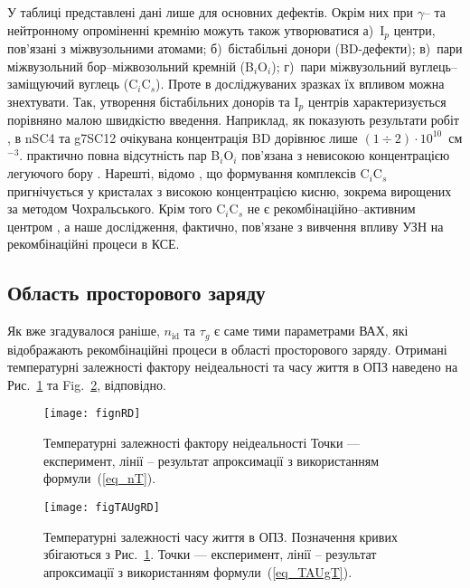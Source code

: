 У таблиці представлені дані лише для основних дефектів.
Окрім них при $\gamma$-- та нейтронному опроміненні кремнію можуть також утворюватися
а)~I$_p$ центри, пов'язані з міжвузольними атомами;
б)~бістабільні донори (BD-дефекти);
в)~пари міжвузольний бор--міжвозольний кремній (B$_i$O$_i$);
г)~пари міжвузольний вуглець--заміщуючий вуглець (C$_i$C$_s$).
Проте в досліджуваних зразках їх впливом можна знехтувати.
Так, утворення бістабільних донорів та I$_p$ центрів характеризується порівняно малою швидкістю введення.
Наприклад, як показують результати робіт \cite{n:gamma,BD:Fret}, в nSC4 та g7SC12 очікувана
концентрація BD дорівнює лише $(1\div2)\cdot10^{10}$~см$^{-3}$.
практично повна відсутність пар B$_i$O$_i$ пов'язана з невисокою концентрацією легуючого бору \cite{SiIntDef}.
Нарешті, відомо \cite{gamma:Kolkr,gamma:Stahl,n:long}, що формування комплексів C$_i$C$_s$ пригнічується у кристалах
з високою концентрацією кисню, зокрема вирощених за методом Чохральського.
Крім того  C$_i$C$_s$ не є рекомбінаційно--активним центром \cite{CiCs:Song}, а наше дослідження,
фактично, пов'язане з вивчення впливу УЗН на рекомбінаційні процеси в КСЕ.



\subsection{Область просторового заряду\label{sbSCR}}

Як вже згадувалося раніше, $n_{\mathrm{id}}$ та $\tau_{g}$ є саме тими параметрами ВАХ, які відображають рекомбінаційні процеси в
області просторового заряду.
Отримані температурні залежності фактору неідеальності та часу життя в ОПЗ наведено на Рис.~\ref{fignRD} та Fig.~\ref{figTAUgRD}, відповідно.

\begin{figure}
\center
\texttt{[image: fignRD]}%
\caption{\label{fignRD}
Температурні залежності фактору неідеальності
\FigCaptionSSCRD
Точки --- експеримент,
лінії -- результат апроксимації з використанням формули~(\ref{eq_nT}).
}%
\end{figure}


\begin{figure}
\center
\texttt{[image: figTAUgRD]}%
\caption{\label{figTAUgRD}
Температурні залежності часу життя в ОПЗ.
Позначення кривих збігаються з Рис.~\ref{fignRD}.
Точки --- експеримент,
лінії -- результат апроксимації з використанням формули~(\ref{eq_TAUgT}).
}%
\end{figure}

